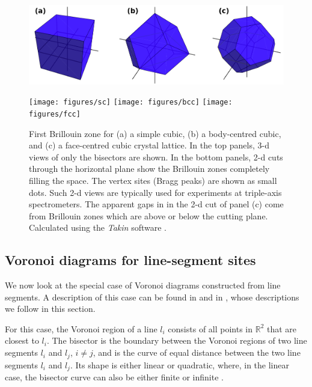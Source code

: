 \begin{figure}[h]
	\begin{center}
		\includegraphics[width = 0.95 \textwidth]{figures/bz}

		\vspace{0.5cm}
		\texttt{[image: figures/sc]}
		\hspace{2.2cm}
		\texttt{[image: figures/bcc]}
		\hspace{2.2cm}
		\texttt{[image: figures/fcc]}
	\end{center}
	\caption[Brillouin zones.]{
		First Brillouin zone for
			(a) a simple cubic,
			(b) a body-centred cubic, and
			(c) a face-centred cubic crystal lattice.
		In the top panels, 3-d views of only the bisectors are shown.
		In the bottom panels, 2-d cuts through the horizontal plane show the Brillouin zones 
		completely filling the space. The vertex sites (Bragg peaks) are shown as small dots.
		Such 2-d views are typically used for experiments at triple-axis spectrometers.
		The apparent gaps in in the 2-d cut of panel (c) come from Brillouin zones which are 
		above or below the cutting plane.
		Calculated using the \textit{Takin} software \cite{Takin2021, Takin2017, Takin2016}.
		\label{fig:cubic_bzs}}
\end{figure}



\subsection{Voronoi diagrams for line-segment sites}
\label{sec:voro_ls}
We now look at the special case of Voronoi diagrams constructed from line segments.
A description of this case can be found in \cite[Ch. 7.3, pp. 160-163]{Berg2008} and in 
\cite[pp. 242-247]{FUH_geo2020}, whose descriptions we follow in this section.

For this case, the Voronoi region of a line $l_i$ consists of all points in $\mathbb{R}^2$ that 
are closest to $l_i$. The bisector is the boundary between the Voronoi regions of two line segments 
$l_i$ and $l_j$, $i \neq j$,
and is the curve of equal distance between the two line segments $l_i$ and $l_j$.
Its shape is either linear or quadratic, where, in the linear case, the bisector curve can also be either
finite or infinite \cite[pp. 243-244]{FUH_geo2020}.

